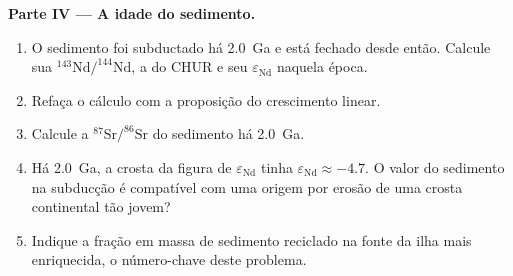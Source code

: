 \begin{problem}
\noindent\textbf{Parte IV --- A idade do sedimento.}
\begin{enumerate}[resume]
\item O sedimento foi subductado há \qty{2.0}{Ga} e está fechado desde então.
Calcule sua $^{143}\mathrm{Nd}/^{144}\mathrm{Nd}$, a do CHUR e seu
$\varepsilon_{\mathrm{Nd}}$ naquela época.
\item Refaça o cálculo com a proposição do crescimento linear.
\item Calcule a $^{87}\mathrm{Sr}/^{86}\mathrm{Sr}$ do sedimento há \qty{2.0}{Ga}.
\item Há \qty{2.0}{Ga}, a crosta da figura de $\varepsilon_{\mathrm{Nd}}$ tinha
$\varepsilon_{\mathrm{Nd}} \approx -4.7$. O valor do sedimento na subducção é compatível
com uma origem por erosão de uma crosta continental tão jovem?
\item Indique a fração em massa de sedimento reciclado na fonte da ilha mais
enriquecida, o número-chave deste problema.
\end{enumerate}
\end{problem}
